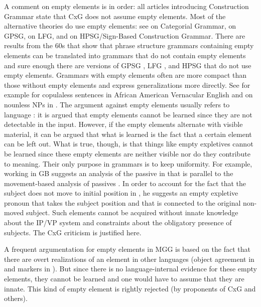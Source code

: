 \documentclass[output=paper,biblatex,babelshorthands,newtxmath,draftmode,colorlinks,citecolor=brown]{langscibook}
\begin{document}
A comment on empty elements is in order: all articles introducing Construction Grammar state that
CxG does not assume empty elements. Most of the alternative theories do use empty elements: see
\citet{KoenigE99a-u} on Categorial Grammar, \citet*[]{GKPS85a} on GPSG, \citet[]{Bresnan2001a} on LFG,  and  on HPSG/Sign-Based
Construction Grammar. There are results from the 60s that show that phrase structure grammars
containing empty elements can be translated into grammars that do not contain empty elements
\citep*[, Lemma~4.1]{BHPS61a} and sure enough there are versions of GPSG \citep[--77]{Uszkoreit87a}, LFG \citep{KZ89a,DKK2001a-u}, and HPSG \parencites{BMS2001a}[]{Sag2010b} that do not use empty elements. Grammars with empty elements often are more compact than
those without empty elements and express generalizations more directly. See for example
\citet{Bender2000a} for copulaless sentences in African American Vernacular
English and \citet{Mueller2004e} on nounless NPs in
. The argument against empty elements usually refers to language : it
is argued that empty elements cannot be learned since they are not detectable in the input. However,
if the empty elements alternate with visible material, it can be argued that what is learned is the
fact that a certain element can be left out. What is true, though, is that things like empty
expletives cannot be learned since these empty elements are neither visible nor do they contribute to
meaning. Their only purpose in grammars is to keep uniformity. For example, \citet{Grewendorf93}
working in GB suggests an analysis of the passive in  that is parallel to the movement-based analysis of 
passives \citep[]{Chomsky81a}. In order to account for the fact that the subject does not move to
initial position in , he suggests an empty expletive pronoun that takes the subject position and that is connected to the original
non-moved subject. Such elements cannot be acquired without innate knowledge about the IP/VP system and
constraints about the obligatory presence of subjects. The CxG criticism is justified here.

A frequent argumentation for empty elements in MGG is based on the fact that there are overt
realizations of an element in other languages (\eg object agreement in  and  markers in
). But since there is no language-internal evidence for these empty elements, they cannot be
learned and one would have to assume that they are innate. This kind of empty element is rightly
rejected (by proponents of CxG and others).
\end{document}
